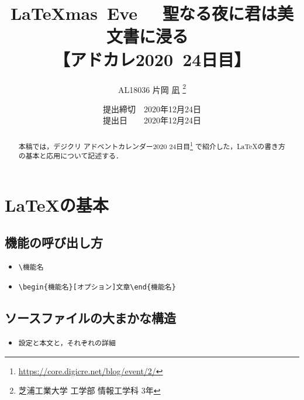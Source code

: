 \documentclass[a4paper]{jsarticle}
\title{
\vspace{-1cm} %
\LaTeX mas\ Eve~ ~聖なる夜に君は美文書に浸る~ \\
【アドカレ2020\ 24日目】}
\author{AL18036 片岡 凪 \thanks{芝浦工業大学 工学部 情報工学科 3年}}
\date{提出締切　2020年12月24日 \\
提出日　　2020年12月24日}
\begin{document}

\maketitle


\setcounter{tocdepth}{2}
\tableofcontents
\newpage


\begin{abstract}
  本稿では，デジクリ アドベントカレンダー2020 24日目\footnote{\url{https://core.digicre.net/blog/event/2/}} で紹介した，LaTeXの書き方の基本と応用について記述する．
\end{abstract}


\section{LaTeXの基本}


\subsection{機能の呼び出し方}
\begin{itemize}
  \item \verb|\機能名|
  \item \verb|\begin{機能名}[オプション]文章\end{機能名}|
\end{itemize}


\subsection{ソースファイルの大まかな構造}
\begin{itemize}
  \item \verb|設定と本文と，それぞれの詳細|
\end{itemize}
\end{document}
